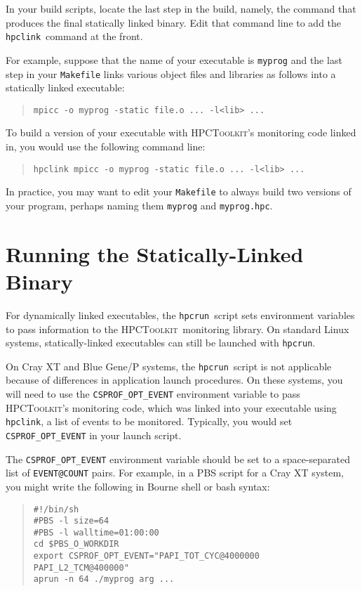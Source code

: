 \documentclass[12pt]{article}
\newcommand{\HPCToolkit}{\textsc{HPCToolkit}}
\newcommand{\hpcrun}{\texttt{hpcrun}}
\newcommand{\hpclink}{\texttt{hpclink}}
\begin{document}
In your build scripts, locate the last step in the build, namely,  the
command that produces the final statically linked binary.  Edit that command line to add the \hpclink\ command at the front.

For example, suppose that the name of your executable is {\tt myprog} and the last step in
your {\tt Makefile} links various object files and libraries as
follows into a statically linked executable:
%
\begin{quote}
\verb|mpicc -o myprog -static file.o ... -l<lib> ...|
\end{quote}
%
To build a version of your executable with \HPCToolkit's monitoring code linked in, you would use the
following command line:
%
\begin{quote}
\verb|hpclink mpicc -o myprog -static file.o ... -l<lib> ...|
\end{quote}

In practice, you may want to edit your {\tt Makefile} to always build
two versions of your program, perhaps naming them {\tt myprog} and
{\tt myprog.hpc}.

\section{Running the Statically-Linked Binary}

For dynamically linked executables, the \hpcrun\ script sets environment variables to
pass information to the \HPCToolkit\ monitoring library. On standard Linux systems,  statically-linked executables can still be launched with \hpcrun. 

On Cray XT and Blue Gene/P systems,  the  \hpcrun\   script is not applicable because of differences in application launch procedures.
On these systems, you will need to use the {\tt CSPROF\_OPT\_EVENT} environment variable to pass \HPCToolkit's monitoring code, which was linked into your executable using \hpclink, a  list of events to be monitored.
Typically, you would set {\tt CSPROF\_OPT\_EVENT}  in your launch script.

The {\tt CSPROF\_OPT\_EVENT} environment variable
should be set to a space-separated list of {\tt EVENT@COUNT} pairs.
For example, in a PBS script for a Cray XT system, you might write the following in Bourne shell or bash syntax:

\begin{quote}
\begin{verbatim}
#!/bin/sh
#PBS -l size=64
#PBS -l walltime=01:00:00
cd $PBS_O_WORKDIR
export CSPROF_OPT_EVENT="PAPI_TOT_CYC@4000000 PAPI_L2_TCM@400000"
aprun -n 64 ./myprog arg ...
\end{verbatim}
\end{quote}
\end{document}
